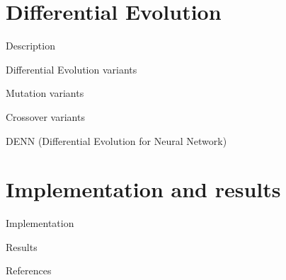 \documentclass{beamer}
\begin{document}
  \section{Differential Evolution}
  \begin{frame}{Description}
  
  \end{frame}
  \begin{frame}{Differential Evolution variants}
  
  \end{frame}
  \begin{frame}{Mutation variants}
  	
  \end{frame}
  \begin{frame}{Crossover variants}
  	
  \end{frame}
  \begin{frame}{DENN (Differential Evolution for Neural Network)}
  
  \end{frame}
  \section{Implementation and results}
  \begin{frame}{Implementation}
  
  \end{frame}
  \begin{frame}{Results}
  
  \end{frame}
  \begin{frame}{References}
        
\end{frame}
\end{document}
